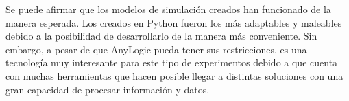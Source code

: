 Se puede afirmar que los modelos de simulación creados han funcionado de la manera esperada.
Los creados en Python fueron los más adaptables y maleables debido a la posibilidad de desarrollarlo de la manera más conveniente.
Sin embargo, a pesar de que AnyLogic pueda tener sus restricciones, es una tecnología muy interesante para este tipo de experimentos debido a que cuenta con muchas herramientas que hacen posible llegar a distintas soluciones con una gran capacidad de procesar información y datos.
